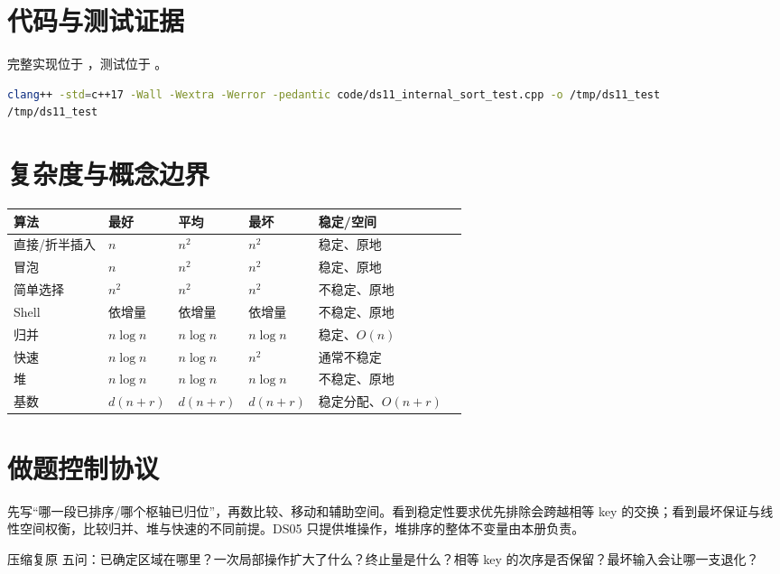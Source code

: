 \documentclass[UTF8,fontset=none,11pt,a4paper]{ctexart}
\begin{document}
\section{代码与测试证据}
完整实现位于 ，测试位于 。


\begin{lstlisting}[language=bash]
clang++ -std=c++17 -Wall -Wextra -Werror -pedantic code/ds11_internal_sort_test.cpp -o /tmp/ds11_test
/tmp/ds11_test
\end{lstlisting}

\section{复杂度与概念边界}
\begin{center}\small
\begin{tabularx}{\linewidth}{L{2.4cm}C{1.7cm}C{1.7cm}C{1.4cm}YY}\toprule
算法 & 最好 & 平均 & 最坏 & 稳定/空间\\\midrule
直接/折半插入 & $n$ & $n^2$ & $n^2$ & 稳定、原地\\
冒泡 & $n$ & $n^2$ & $n^2$ & 稳定、原地\\
简单选择 & $n^2$ & $n^2$ & $n^2$ & 不稳定、原地\\
Shell & 依增量 & 依增量 & 依增量 & 不稳定、原地\\
归并 & $n\log n$ & $n\log n$ & $n\log n$ & 稳定、$O(n)$\\
快速 & $n\log n$ & $n\log n$ & $n^2$ & 通常不稳定\\
堆 & $n\log n$ & $n\log n$ & $n\log n$ & 不稳定、原地\\
基数 & $d(n+r)$ & $d(n+r)$ & $d(n+r)$ & 稳定分配、$O(n+r)$\\\bottomrule\end{tabularx}\end{center}

\section{做题控制协议}
先写“哪一段已排序/哪个枢轴已归位”，再数比较、移动和辅助空间。看到稳定性要求优先排除会跨越相等 key 的交换；看到最坏保证与线性空间权衡，比较归并、堆与快速的不同前提。DS05 只提供堆操作，堆排序的整体不变量由本册负责。
\begin{corebox}{压缩复原}
五问：已确定区域在哪里？一次局部操作扩大了什么？终止量是什么？相等 key 的次序是否保留？最坏输入会让哪一支退化？
\end{corebox}
\end{document}
